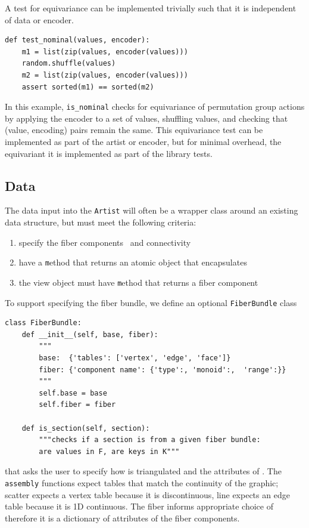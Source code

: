 \documentclass[../main.tex]{subfiles}
\begin{document}
A test for equivariance can be implemented trivially such that it is independent of data or encoder.
\begin{verbatim}
def test_nominal(values, encoder):
    m1 = list(zip(values, encoder(values)))
    random.shuffle(values)
    m2 = list(zip(values, encoder(values)))
    assert sorted(m1) == sorted(m2)
\end{verbatim}
In this example, \texttt{is_nominal} checks for equivariance of permutation group actions by applying the encoder to a set of values, shuffling values, and checking that (value, encoding) pairs remain the same. This equivariance test can be implemented as part of the artist or encoder, but for minimal overhead, the equivariant it is implemented as part of the library tests.

\subsection{Data \dtotal}
\label{sec:code_data}
The data input into the \texttt{Artist} will often be a wrapper class around an existing data structure, but must meet the following criteria:
\begin{enumerate}
\item specify the fiber components \dfiber\ and connectivity \dbase\
\item have a \texttt method that returns an atomic object that encapsulates \dsection\
\item the view object must have \texttt method that returns a fiber component
\end{enumerate}
To support specifying the fiber bundle, we define an optional \texttt{FiberBundle} class

\begin{verbatim}
class FiberBundle:
    def __init__(self, base, fiber):
        """
        base:  {'tables': ['vertex', 'edge', 'face']}
        fiber: {'component name': {'type':, 'monoid':,  'range':}}
        """
        self.base = base
        self.fiber = fiber

    def is_section(self, section):
        """checks if a section is from a given fiber bundle:
        are values in F, are keys in K"""
\end{verbatim}

that asks the user to specify how \dbase is triangulated and the attributes of \dfiber. The \texttt{assembly} functions expect tables that match the continuity of the graphic; scatter expects a vertex table because it is discontinuous, line expects an edge table because it is 1D continuous. The fiber informs appropriate choice of \vchannel\, therefore it is a dictionary of attributes of the fiber components.  
\end{document}
